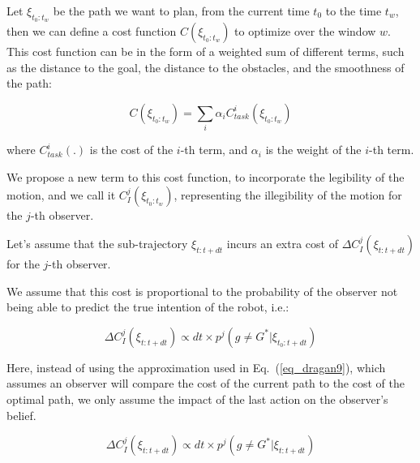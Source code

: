 Let $\xi_{t_0:t_w}$ be the path we want to plan, from the current time $t_0$ to the time $t_w$, then we can define a cost function $C(\xi_{t_0:t_w})$ to optimize over the window $w$.
This cost function can be in the form of a weighted sum of different terms, such as the distance to the goal, the distance to the obstacles, and the smoothness of the path:

\begin{equation}
    \label{eq:cost_general}
    C(\xi_{t_0:t_w}) = \sum_i \alpha_i C_{task}^i(\xi_{t_0:t_w})
\end{equation}

\noindent
where $C_{task}^i(.)$ is the cost of the $i$-th term, and $\alpha_i$ is the weight of the $i$-th term.

We propose a new term to this cost function, to incorporate the legibility of the motion,
and we call it $C_{I}^j(\xi_{t_0:t_w})$, representing the illegibility of the motion for the $j$-th observer.


Let's assume that the sub-trajectory $\xi_{t:t+dt}$ incurs an extra cost of $\Delta C_{I}^j(\xi_{t:t+dt})$ for the $j$-th observer.

We assume that this cost is proportional to the probability of the observer not being able to predict the true intention of the robot, i.e.:

\begin{equation}
    \label{eq:cost_leg}
    \Delta C_{I}^j(\xi_{t:t+dt}) \propto dt \times  p^j(g \neq G^* | \xi_{t_0:t+dt})
\end{equation}

\noindent
Here, instead of using the approximation used in Eq.~(\ref{eq_dragan9}),
which assumes an observer will compare the cost of the current path to the cost of the optimal path,
we only assume the impact of the last action on the observer's belief.

\begin{equation}
    \label{eq:cost_leg_approx}
    \Delta C_{I}^j(\xi_{t:t+dt}) \propto dt \times  p^j(g \neq G^* | \xi_{t:t+dt})
\end{equation}

